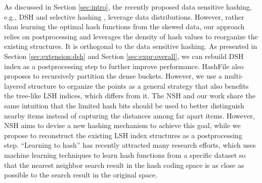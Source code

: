  As discussed in Section \ref{sec:intro}, the recently proposed data sensitive hashing, e.g., DSH \cite{Gao:2014:DDS:2588555.2588565} and selective hashing \cite{Gao:2015:SHC:2783258.2783284}, leverage data distributions. However, rather than learning the optimal hash functions from the skewed data, our approach relies on postprocessing and leverages the density of hash values to reorganize the existing structures. It is orthogonal to the data sensitive hashing. As presented in Section \ref{sec:extension:dsh} and Section \ref{sec:expr:overall}, we can rebuild DSH index as a postprocessing step to further improve performance. HashFile \cite{Zhang:2011:HEI:2004686.2005629} also proposes to recursively partition the dense buckets. However, we use a multi-layered structure to organize the points as a general strategy that also benefits the tree-like LSH indices, which differs from it. The NSH \cite{Park:2015:NH:2850583.2850589} and our work share the same intuition that the limited hash bits should be used to better distinguish nearby items instead of capturing the distances among far apart items. However, NSH aims to devise a new hashing mechanism to achieve this goal, while we propose to reconstruct the existing LSH index structures as a postprocessing step. ``Learning to hash'' \cite{7915742} has recently attracted many research efforts, which uses machine learning techniques to learn hash functions from a specific dataset so that the nearest neighbor search result in the hash coding space is as close as possible to the search result in the original space.




